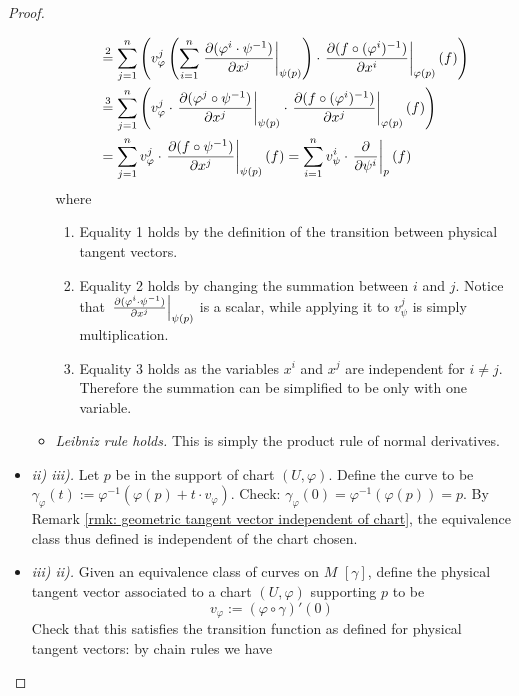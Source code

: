 \documentclass{article}
\begin{document}
\begin{proof}
\begin{itemize}
\begin{itemize}
\begin{align*}
                & \overset{2}{=} \sum_{j = 1}^{n} \left( v_{\varphi}^j \left( \sum_{i = 1}^{n} \left.\frac{\partial (\varphi^i \cdot \psi^{-1})}{\partial x^j}\right|_{\psi(p)} \right) \cdot \left.\frac{\partial (f \circ (\varphi^i)^{-1})}{\partial x^i}\right|_{\varphi(p)} (f) \right) \\
                & \overset{3}{=} \sum_{j = 1}^{n} \left( v_{\varphi}^j \cdot \left.\frac{\partial (\varphi^j \circ \psi^{-1})}{\partial x^j}\right|_{\psi(p)} \cdot \left.\frac{\partial (f \circ (\varphi^i)^{-1})}{\partial x^j}\right|_{\varphi(p)} (f) \right) \\
                & = \sum_{j = 1}^n v_{\varphi}^j \cdot \left.\frac{\partial (f \circ \psi^{-1})}{\partial x^j}\right|_{\psi(p)} (f) = \sum_{i = 1}^n v_{\psi}^i \cdot \left.\frac{\partial }{\partial \psi^i}\right|_{p}(f)
            \end{align*}
            where
            \begin{enumerate}
                \item Equality 1 holds by the definition of the transition between physical tangent vectors.
                \item Equality 2 holds by changing the summation between $i$ and $j$. Notice that $\left.\frac{\partial (\varphi^i \cdot \psi^{-1})}{\partial x^j}\right|_{\psi(p)}$ is a scalar, while applying it to $v_{\psi}^j$ is simply multiplication. 
                \item Equality 3 holds as the variables $x^i$ and $x^j$ are independent for $i \neq j$. Therefore the summation can be simplified to be only with one variable.
            \end{enumerate}
            \item \emph{Leibniz rule holds.} This is simply the product rule of normal derivatives.
        \end{itemize}
        \item \emph{ii) \implies iii).} Let $p$ be in the support of chart $(U, \varphi)$. Define the curve to be $\gamma_{\varphi} (t) := \varphi^{-1}(\varphi(p) + t \cdot v_{\varphi})$. Check: $\gamma_{\varphi}(0) = \varphi^{-1}(\varphi(p)) = p$. By Remark \ref{rmk: geometric tangent vector independent of chart}, the equivalence class thus defined is independent of the chart chosen.
        \item \emph{iii) \implies ii).} Given an equivalence class of curves on $M$ $[\gamma]$, define the physical tangent vector associated to a chart $(U, \varphi)$ supporting $p$ to be
        \[
            v_{\varphi} := (\varphi \circ \gamma)'(0)
        \]
        Check that this satisfies the transition function as defined for physical tangent vectors: by chain rules we have

\end{itemize}
\end{proof}
\end{document}
